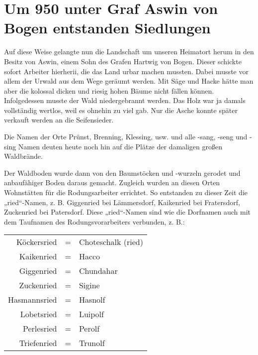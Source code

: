 \documentclass[12pt,a4paper]{book}
\begin{document}
\section[Unter Graf Aswin von Bogen]{Um 950 unter Graf Aswin von Bogen
entstanden Siedlungen}

Auf diese Weise gelangte nun die Landschaft um unseren Heimatort herum
in den Besitz von Aswin, einem Sohn des Grafen Hartwig von Bogen. Dieser
schickte sofort Arbeiter hierherii, die das Land urbar machen mussten.
Dabei musste vor allem der Urwald aus dem Wege geräumt werden. Mit Säge
und Hacke hätte man aber die kolossal dicken und riesig hohen Bäume
nicht fällen können. Infolgedessen musste der Wald niedergebrannt
werden. Das Holz war ja damals vollständig wertlos, weil es ohnehin zu
viel gab. Nur die Asche konnte später verkauft werden an die
Seifensieder.

Die Namen der Orte Prünst, Brenning, Klessing, usw. und alle -sang,
-seng und -sing Namen deuten heute noch hin auf die Plätze der damaligen
großen Waldbrände.

Der Waldboden wurde dann von den Baumstöcken und -wurzeln gerodet und
anbaufähiger Boden daraus gemacht. Zugleich wurden an diesen Orten
Wohnstätten für die Rodungsarbeiter errichtet. So entstanden zu dieser
Zeit die „ried“-Namen, z. B. Giggenried bei Lämmersdorf, Kaikenried bei
Fratersdorf, Zuckenried bei Patersdorf. Diese „ried“-Namen sind wie die
Dorfnamen auch mit dem Taufnamen des Rodungsvorarbeiters verbunden, z.
B.:

\begin{center}
\begin{tabular}{rcl}
Köckersried & = & Choteschalk (ried) \\

Kaikenried & = & Hacco \\

Giggenried & = & Chundahar \\

Zuckenried & = & Sigine \\

Hasmannsried & = & Hasnolf \\

Lobetsried & = & Luipolf \\

Perlesried & = & Perolf \\

Triefenried & = & Trunolf \\
\end{tabular}
\end{center}
\end{document}
